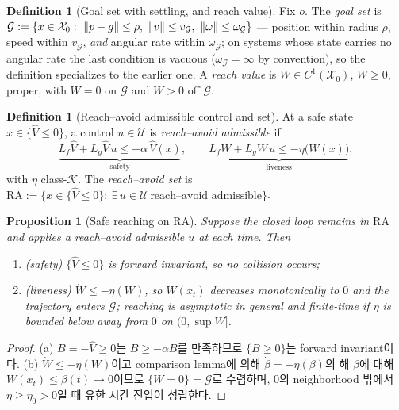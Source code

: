 \documentclass[11pt]{article}
\theoremstyle{plain}
\newtheorem{proposition}[theorem]{Proposition}
\theoremstyle{definition}
\newtheorem{definition}[theorem]{Definition}
\theoremstyle{remark}
\DeclarePairedDelimiter{\norm}{\lVert}{\rVert}
\newcommand{\calX}{\mathcal{X}}
\newcommand{\calU}{\mathcal{U}}
\newcommand{\calK}{\mathcal{K}}
\newcommand{\Vhat}{\widehat V}
\newcommand{\Lg}{L_g}
\newcommand{\Lf}{L_f}
\newcommand{\eqdef}{:=}
\begin{document}
\begin{definition}[Goal set with settling, and reach value]\label{def:reach}
Fix $o$. The \emph{goal set} is
$\mathcal G\eqdef\{x\in\calX_0:\ \norm{p-g}\le\rho,\ \norm{v}\le v_{\mathcal G},\
\norm{\omega}\le\omega_{\mathcal G}\}$
--- position within radius $\rho$, speed within $v_{\mathcal G}$, \emph{and} angular rate within
$\omega_{\mathcal G}$; on systems whose state carries no angular rate the last condition is
vacuous ($\omega_{\mathcal G}=\infty$ by convention), so the definition specializes to the
earlier one. A \emph{reach value}
is $W\in C^1(\calX_0)$, $W\ge0$, proper, with $W=0$ on $\mathcal G$ and $W>0$ off $\mathcal G$.
\end{definition}

\begin{definition}[Reach--avoid admissible control and set]\label{def:ra}
At a safe state $x\in\{\Vhat\le0\}$, a control $u\in\calU$ is \emph{reach--avoid admissible} if
\begin{equation}
\underbrace{\Lf\Vhat+\Lg\Vhat\,u\le-\alpha\,\Vhat(x)}_{\text{safety}},
\qquad
\underbrace{\Lf W+\Lg W\,u\le-\eta\big(W(x)\big)}_{\text{liveness}},
\end{equation}
with $\eta$ class-$\calK$. The \emph{reach--avoid set} is
$\mathrm{RA}\eqdef\{x\in\{\Vhat\le0\}:\ \exists\,u\in\calU\ \text{reach--avoid admissible}\}$.
\end{definition}

\begin{proposition}[Safe reaching on \texorpdfstring{$\mathrm{RA}$}{RA}]\label{prop:liveness}
Suppose the closed loop remains in $\mathrm{RA}$ and applies a reach--avoid admissible $u$ at
each time. Then
\begin{enumerate}[label=(\alph*)]
\item (safety) $\{\Vhat\le0\}$ is forward invariant, so no collision occurs;
\item (liveness) $\dot W\le-\eta(W)$, so $W(x_t)$ decreases monotonically to $0$ and the
trajectory enters $\mathcal G$; reaching is asymptotic in general and finite-time if $\eta$ is
bounded below away from $0$ on $(0,\sup W]$.
\end{enumerate}
\end{proposition}
\begin{proof}
(a) $B=-\Vhat\ge0$는 $\dot B\ge-\alpha B$를 만족하므로 $\{B\ge0\}$는 forward invariant이다.
(b) $\dot W\le-\eta(W)$이고 comparison lemma에 의해 $\dot\beta=-\eta(\beta)$의 해 $\beta$에 대해
$W(x_t)\le\beta(t)\to0$이므로 $\{W=0\}=\mathcal G$로 수렴하며, $0$의 neighborhood 밖에서
$\eta\ge\eta_0>0$일 때 유한 시간 진입이 성립한다.
\end{proof}
\end{document}
